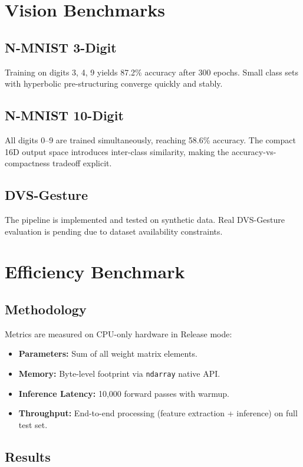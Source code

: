 \documentclass[conference]{IEEEtran}
\begin{document}
\section{Vision Benchmarks}

\subsection{N-MNIST 3-Digit}
Training on digits 3, 4, 9 yields 87.2\% accuracy after 300 epochs. Small class sets with hyperbolic pre-structuring converge quickly and stably.

\subsection{N-MNIST 10-Digit}
All digits 0--9 are trained simultaneously, reaching 58.6\% accuracy. The compact 16D output space introduces inter-class similarity, making the accuracy-vs-compactness tradeoff explicit.

\subsection{DVS-Gesture}
The pipeline is implemented and tested on synthetic data. Real DVS-Gesture evaluation is pending due to dataset availability constraints.

\section{Efficiency Benchmark}

\subsection{Methodology}
Metrics are measured on CPU-only hardware in Release mode:
\begin{itemize}
    \item \textbf{Parameters:} Sum of all weight matrix elements.
    \item \textbf{Memory:} Byte-level footprint via \texttt{ndarray} native API.
    \item \textbf{Inference Latency:} 10,000 forward passes with warmup.
    \item \textbf{Throughput:} End-to-end processing (feature extraction + inference) on full test set.
\end{itemize}

\subsection{Results}
\end{document}
